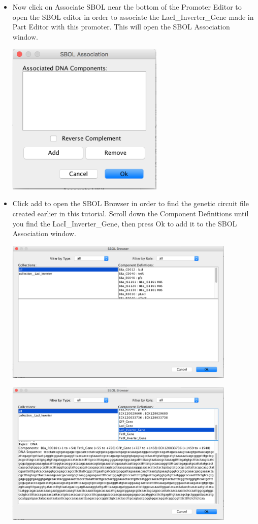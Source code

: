 \documentclass[titlepage,11pt]{article}
\begin{document}
\begin{itemize}
\item Now click on Associate SBOL near the bottom of the Promoter Editor to open the SBOL editor in order to associate the LacI\_Inverter\_Gene made in Part Editor with this promoter. This will open the SBOL Association window.

\begin{center}
\includegraphics[width=75mm]{"screenshots/LacI Inverter Blank Associate SBOL"}
\end{center}

\item Click add to open the SBOL Browser in order to find the genetic circuit file created earlier in this tutorial. Scroll down the Component Definitions until you find the LacI\_Inverter\_Gene, then press Ok to add it to the SBOL Association window.

\begin{center}
\includegraphics[width=110mm]{"screenshots/SBOL Browser"}
\end{center}

\begin{center}
\includegraphics[width=110mm]{"screenshots/SBOL Browser pLac"}
\end{center}


\end{itemize}
\end{document}
